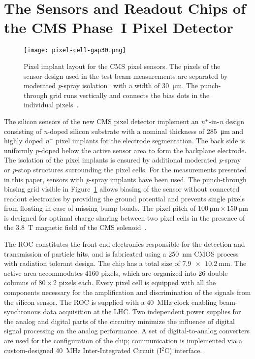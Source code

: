 \documentclass[a4paper,11pt]{article}
\begin{document}
\section{The Sensors and Readout Chips of the CMS Phase~I Pixel Detector}
\label{sec:chip}

\begin{figure}[tbp]
  \centering
  \texttt{[image: pixel-cell-gap30.png]}
  \caption[Pixel implant layout for the CMS pixel sensors]{Pixel implant layout for the CMS pixel sensors. The pixels of the sensor design used in the test beam measurements are separated by moderated \emph{p}-spray isolation~\cite{moderated-pspray} with a width of \SI{30}{\micro\meter}. The punch-through grid runs vertically and connects the bias dots in the individual pixels~\cite{tilman-private}.}
  \label{fig:pixelcell}
\end{figure}

The silicon sensors of the new CMS pixel detector implement an \emph{n$^+$}-in-\emph{n} design consisting of \emph{n}-doped silicon substrate with a nominal thickness of \SI{285}{\micro\meter} and highly doped \emph{n$^+$} pixel implants for the electrode segmentation.
The back side is uniformly \emph{p}-doped below the active sensor area to form the backplane electrode.
The isolation of the pixel implants is ensured by additional moderated \emph{p}-spray~\cite{moderated-pspray} or \emph{p}-stop structures surrounding the pixel cells.
For the measurements presented in this paper, sensors with \emph{p}-spray implants have been used.
The punch-through biasing grid visible in Figure~\ref{fig:pixelcell} allows biasing of the sensor without connected readout electronics by providing the ground potential and prevents single pixels from floating in case of missing bump bonds.
The pixel pitch of $\SI{100}{\um} \times \SI{150}{\um}$ is designed for optimal charge sharing between two pixel cells in the presence of the \SI{3.8}{\tesla} magnetic field of the CMS solenoid~\cite{sensors}.

The ROC constitutes the front-end electronics responsible for the detection and transmission of particle hits, and is fabricated using a \SI{250}{\nm} CMOS process with radiation tolerant design.
The chip has a total size of $\SI{7.9 x 10.2}{\mm}$.
The active area accommodates 4160 pixels, which are organized into 26 double columns of $80 \times 2$ pixels each.
Every pixel cell is equipped with all the components necessary for the amplification and discrimination of the signals from the silicon sensor.
The ROC is supplied with a \SI{40}{\MHz} clock enabling beam-synchronous data acquisition at the LHC.
Two independent power supplies for the analog and digital parts of the circuitry minimize the influence of digital signal processing on the analog performance.
A set of digital-to-analog converters are used for the configuration of the chip; communication is implemented via a custom-designed \SI{40}{\MHz} Inter-Integrated Circuit (I$^2$C) interface.
\end{document}
